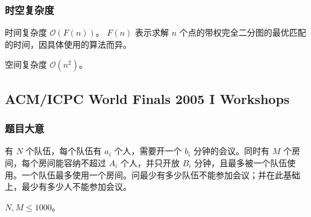 			\subsubsection{时空复杂度}
				时间复杂度 $\mathcal{O}\left(F(n) \right)$。 $F(n)$ 表示求解 $n$ 个点的带权完全二分图的最优匹配的时间，因具体使用的算法而异。
					
				空间复杂度 $\mathcal{O}\left(n^2\right)$。
				

\newpage
		\subsection{ACM/ICPC World Finals 2005 I Workshops}
			\subsubsection{题目大意}
				有 $N$ 个队伍，每个队伍有 $a_i$ 个人，需要开一个 $b_i$ 分钟的会议。同时有 $M$ 个房间，每个房间能容纳不超过 $A_i$ 个人，并只开放 $B_i$ 分钟，且最多被一个队伍使用。一个队伍最多使用一个房间。问最少有多少队伍不能参加会议；并在此基础上，最少有多少人不能参加会议。
				
				$N, M \le 1000$。
			
